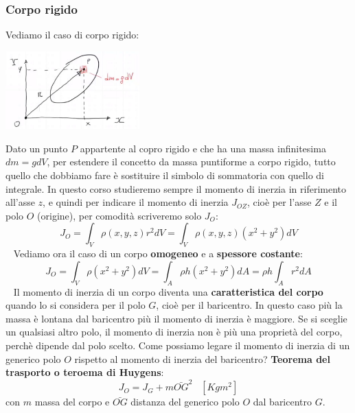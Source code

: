 \subsubsection{Corpo rigido}
Vediamo il caso di corpo rigido:
\begin{center}
    \includegraphics[height=3cm]{../lezione8/img4.JPG}
\end{center}
Dato un punto $P$ appartente al copro rigido e che ha una massa infinitesima $dm = g dV$, per estendere il concetto da massa puntiforme a corpo rigido, tutto quello che dobbiamo fare è sostituire il simbolo di sommatoria con quello di integrale.\newline
\newline
In questo corso studieremo sempre il momento di inerzia in riferimento all'asse $z$, e quindi per indicare il momento di inerzia $J_{OZ}$, cioè per l'asse $Z$ e il polo $O$ (origine), per comodità scriveremo solo $J_O$:
\[
    J_{O} = \int_V \rho(x,y,z) r^2 dV = \int_V \rho(x,y,z) (x^2+y^2) dV
\]
\ \newline
Vediamo ora il caso di un corpo \textbf{omogeneo} e a \textbf{spessore costante}:
\[
    J_O = \int_V \rho(x^2+y^2) dV = \int_A \rho h(x^2 + y^2) dA = \rho h \int_A r^2 dA
\]
\ \newline
Il momento di inerzia di un corpo diventa una \textbf{caratteristica del corpo} quando lo si considera per il polo $G$, cioè per il baricentro. In questo caso più la massa è lontana dal baricentro più il momento di inerzia è maggiore.\newline
Se si sceglie un qualsiasi altro polo, il momento di inerzia non è più una proprietà del corpo, perchè dipende dal polo scelto.\newline
\newline
Come possiamo legare il momento di inerzia di un generico polo $O$ rispetto al momento di inerzia del baricentro?\newline
\textbf{Teorema del trasporto o teroema di Huygens}:
\[
    J_O = J_G + m \bar{OG}^2 \;\;\;[Kg m^2]
\]
con $m$ massa del corpo e $\bar{OG}$ distanza del generico polo $O$ dal baricentro $G$.
\newline
